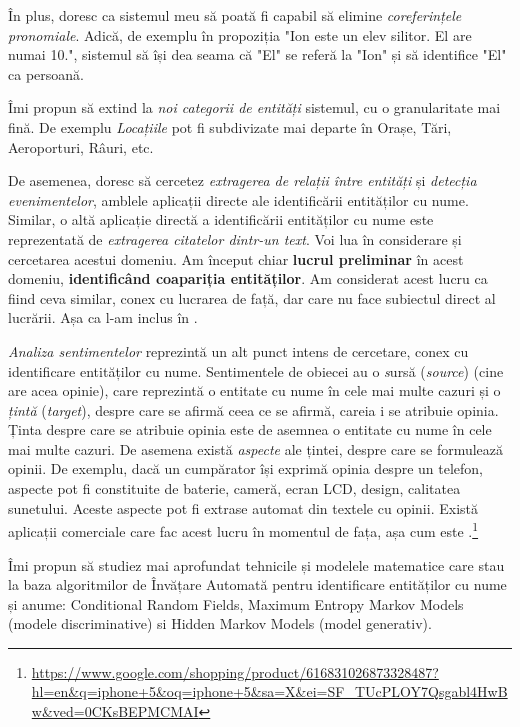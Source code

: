 În plus, doresc ca sistemul meu să poată fi capabil să elimine \textit{coreferințele pronomiale}. Adică, de exemplu în propoziția "Ion este un elev silitor. El are numai 10.", sistemul să își dea seama că "El" se referă la "Ion" și să identifice "El" ca persoană.

Îmi propun să extind la \textit{noi categorii de entități} sistemul, cu o granularitate mai fină. De exemplu \textit{Locațiile} pot fi subdivizate mai departe în Orașe, Tări, Aeroporturi, Râuri, etc.

De asemenea, doresc să cercetez \textit{extragerea de relații între entități} și \textit{detecția evenimentelor}, amblele aplicații directe ale identificării entităților cu nume. Similar, o altă aplicație directă a identificării entităților cu nume este reprezentată de \textit{extragerea citatelor dintr-un text}. Voi lua în considerare și cercetarea acestui domeniu. Am început chiar\textbf{ lucrul preliminar} în acest domeniu, \textbf{identificând coapariția entităților}. Am considerat acest lucru ca fiind ceva similar, conex cu lucrarea de față, dar care nu face subiectul direct al lucrării. Așa ca l-am inclus în .

\textit{Analiza sentimentelor} reprezintă un alt punct intens de cercetare, conex cu identificare entităților cu nume. Sentimentele de obiecei au o \textit{s}ursă (\textit{source}) (cine are acea opinie), care reprezintă o entitate cu nume în cele mai multe cazuri și o \textit{țintă} (\textit{target}), despre care se afirmă ceea ce se afirmă, careia i se atribuie opinia. Ținta despre care se atribuie opinia este de asemnea o entitate cu nume în cele mai multe cazuri. De asemena există \textit{aspecte} ale țintei, despre care se formulează opinii. De exemplu, dacă un cumpărator își exprimă opinia despre un telefon, aspecte pot fi constituite de baterie, cameră, ecran LCD, design, calitatea sunetului. Aceste aspecte pot fi extrase automat din textele cu opinii. Există aplicații comerciale care fac acest lucru în momentul de fața, așa cum este \textit{}.\footnote{\url{https://www.google.com/shopping/product/616831026873328487?hl=en\&q=iphone+5\&oq=iphone+5\&sa=X\&ei=SF_TUcPLOY7Qsgabl4HwBw\&ved=0CKsBEPMCMAI}}

Îmi propun să studiez mai aprofundat tehnicile și modelele matematice care stau la baza algoritmilor de Învățare Automată pentru identificare entităților cu nume și anume: Conditional Random Fields, Maximum Entropy Markov Models (modele discriminative) si Hidden Markov Models (model generativ). 

